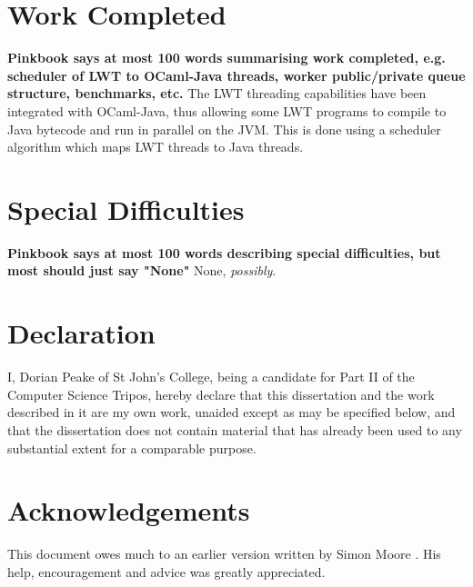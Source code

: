 \documentclass[12pt,twoside,notitlepage]{report}
\begin{document}
\section*{Work Completed}
{\bf Pinkbook says at most 100 words summarising work completed, e.g. scheduler of LWT to OCaml-Java threads, worker public/private queue structure, benchmarks, etc.}
The LWT threading capabilities have been integrated with OCaml-Java, thus allowing some LWT programs to compile to Java bytecode and run in parallel on the JVM. This is done using a scheduler algorithm which maps LWT threads to
Java threads. 

\section*{Special Difficulties}
{\bf Pinkbook says at most 100 words describing special difficulties, but most should just say "None" }
None, {\em possibly}.

\newpage
\section*{Declaration}

I, Dorian Peake of St John's College, being a candidate for Part II of the Computer
Science Tripos, hereby declare
that this dissertation and the work described in it are my own work,
unaided except as may be specified below, and that the dissertation
does not contain material that has already been used to any substantial
extent for a comparable purpose.

\bigskip
{}

\medskip
{}

\cleardoublepage

\tableofcontents

\listoffigures

\newpage
\section*{Acknowledgements}
This document owes much to an earlier version written by Simon Moore
.  His help, encouragement and advice was greatly 
appreciated.


\cleardoublepage        %
\end{document}
